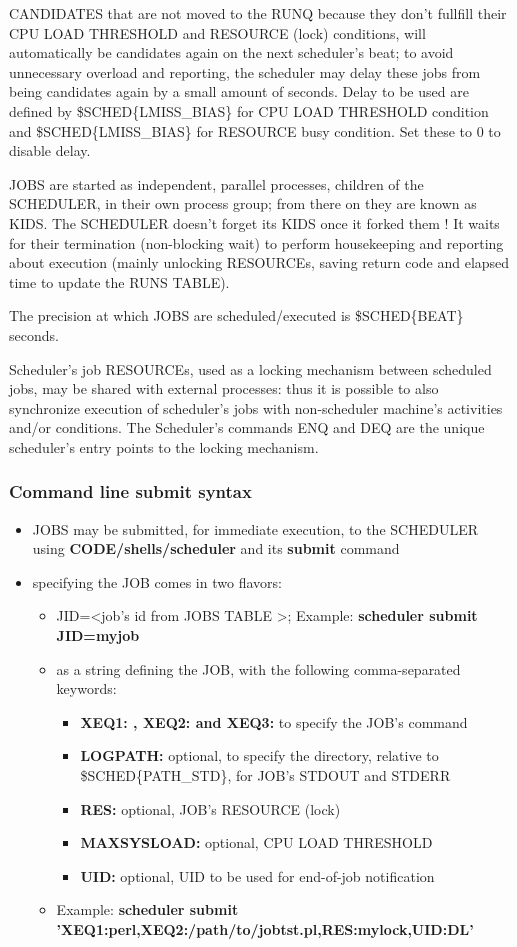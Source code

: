 CANDIDATES that are not moved to the RUNQ because they don't fullfill their CPU LOAD THRESHOLD and RESOURCE (lock) conditions,
will automatically be candidates again on the next scheduler's beat; to avoid unnecessary overload and reporting, the scheduler may delay these jobs
from being candidates again by a small amount of seconds. Delay to be used are defined by \$SCHED\{LMISS\_BIAS\} for CPU LOAD THRESHOLD condition and 
\$SCHED\{LMISS\_BIAS\} for RESOURCE busy condition. Set these to 0 to disable delay. 

JOBS are started as independent, parallel processes, children of the SCHEDULER, in their own process group; from there on they are known as KIDS.   
The SCHEDULER doesn't forget its KIDS once it forked them ! It waits for their termination (non-blocking wait) to perform housekeeping and reporting
about execution (mainly unlocking RESOURCEs, saving return code and elapsed time to update the RUNS TABLE). 

The precision at which JOBS are scheduled/executed is \$SCHED\{BEAT\} seconds.

Scheduler's job RESOURCEs, used as a locking mechanism between scheduled jobs, may be shared with external processes: thus it is possible
to also synchronize execution of scheduler's jobs with non-scheduler machine's activities and/or conditions. 
The Scheduler's commands ENQ and DEQ are the unique scheduler's entry points to the locking mechanism.  

\subsubsection{Command line submit syntax}

\begin{itemize}
\item   JOBS may be submitted, for immediate execution, to the SCHEDULER using \textbf{CODE/shells/scheduler} and its \textbf{submit} command
\item   specifying the JOB comes in two flavors:
\begin{itemize}
\item   JID=\textless job's id from JOBS TABLE \textgreater ; Example: \textbf{scheduler submit JID=myjob}
\item   as a string defining the JOB, with the following comma-separated keywords:
\begin{itemize}
\item   \textbf{XEQ1: , XEQ2: and XEQ3:} to specify the JOB's command
\item   \textbf{LOGPATH:} optional, to specify the directory, relative to \$SCHED\{PATH\_STD\}, for JOB's STDOUT and STDERR
\item   \textbf{RES:} optional, JOB's RESOURCE (lock)
\item   \textbf{MAXSYSLOAD:} optional, CPU LOAD THRESHOLD
\item   \textbf{UID:} optional, UID to be used for end-of-job notification
\end{itemize}
\item   Example:  \textbf{scheduler submit 'XEQ1:perl,XEQ2:/path/to/jobtst.pl,RES:mylock,UID:DL'}
\end{itemize}
\end{itemize}


